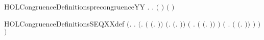 \newcommand{\HOLCongruenceDefinitionsprecongruence}{\UseVerbatim{HOLCongruenceDefinitionsprecongruence}}
\begin{SaveVerbatim}{HOLCongruenceDefinitionsprecongruenceYY}
\HOLTokenTurnstile{} \HOLSymConst{\HOLTokenForall{}}.
         \HOLSymConst{\HOLTokenEquiv{}}
         \HOLSymConst{\HOLTokenConj{}}
       \HOLSymConst{\HOLTokenForall{}}  .   \HOLSymConst{\HOLTokenImp{}}    \HOLSymConst{\HOLTokenImp{}}  \ensuremath{(} \ensuremath{)} \ensuremath{(} \ensuremath{)}
\end{SaveVerbatim}
\newcommand{\HOLCongruenceDefinitionsprecongruenceYY}{\UseVerbatim{HOLCongruenceDefinitionsprecongruenceYY}}
\begin{SaveVerbatim}{HOLCongruenceDefinitionsSEQXXdef}
\HOLTokenTurnstile{}  \HOLSymConst{\ensuremath{=}}
   \ensuremath{(}\HOLTokenLambda{}.
        \HOLSymConst{\HOLTokenForall{}}.
            \ensuremath{(}\HOLSymConst{\HOLTokenForall{}}.
                 \ensuremath{(} \HOLSymConst{\ensuremath{=}} \ensuremath{(}\HOLTokenLambda{}. \ensuremath{)}\ensuremath{)} \HOLSymConst{\HOLTokenDisj{}} \ensuremath{(}\HOLSymConst{\HOLTokenExists{}}.  \HOLSymConst{\ensuremath{=}} \ensuremath{(}\HOLTokenLambda{}. \ensuremath{)}\ensuremath{)} \HOLSymConst{\HOLTokenDisj{}}
                 \ensuremath{(}\HOLSymConst{\HOLTokenExists{}} . \ensuremath{(} \HOLSymConst{\ensuremath{=}} \ensuremath{(}\HOLTokenLambda{}. \HOLSymConst{\ensuremath{\ldotp}} \ensuremath{)}\ensuremath{)} \HOLSymConst{\HOLTokenConj{}}  \ensuremath{)} \HOLSymConst{\HOLTokenDisj{}}
                 \ensuremath{(}\HOLSymConst{\HOLTokenExists{}} .
                      \ensuremath{(} \HOLSymConst{\ensuremath{=}} \ensuremath{(}\HOLTokenLambda{}.   \HOLSymConst{\ensuremath{+}}  \ensuremath{)}\ensuremath{)} \HOLSymConst{\HOLTokenConj{}}   \HOLSymConst{\HOLTokenConj{}}
                       \ensuremath{)} \HOLSymConst{\HOLTokenImp{}}
                  \ensuremath{)} \HOLSymConst{\HOLTokenImp{}}
             \ensuremath{)}
\end{SaveVerbatim}
